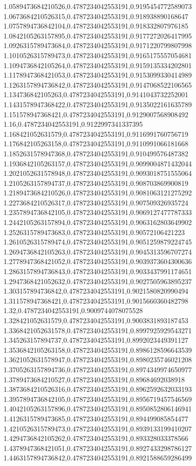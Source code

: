 1.0589473684210526,0.4787234042553191,0.9195454772589073
1.0673684210526315,0.4787234042553191,0.918938890168647
1.0757894736842104,0.4787234042553191,0.918332807976185
1.0842105263157895,0.4787234042553191,0.9177272026417995
1.0926315789473684,0.4787234042553191,0.9171220799807998
1.1010526315789473,0.4787234042553191,0.9165175557054681
1.1094736842105264,0.4787234042553191,0.9159135334202801
1.1178947368421053,0.4787234042553191,0.9153099330414989
1.1263157894736842,0.4787234042553191,0.9147068522106565
1.134736842105263,0.4787234042553191,0.9141043732252001
1.1431578947368422,0.4787234042553191,0.9135022161635789
1.151578947368421,0.4787234042553191,0.9129007568908492
1.16,0.4787234042553191,0.9122997341337395
1.168421052631579,0.4787234042553191,0.9116991760756719
1.176842105263158,0.4787234042553191,0.9110991066181668
1.1852631578947368,0.4787234042553191,0.910499576487382
1.1936842105263157,0.4787234042553191,0.9099004871432044
1.2021052631578948,0.4787234042553191,0.9093018751555064
1.2105263157894737,0.4787234042553191,0.908703869900819
1.2189473684210526,0.4787234042553191,0.9081063121275292
1.2273684210526317,0.4787234042553191,0.907509326935724
1.2357894736842105,0.4787234042553191,0.9069127477787333
1.2442105263157894,0.4787234042553191,0.9063162803649902
1.2526315789473683,0.4787234042553191,0.90572106421223
1.2610526315789474,0.4787234042553191,0.9051259879224745
1.2694736842105263,0.4787234042553191,0.9045313596707274
1.2778947368421052,0.4787234042553191,0.9039373604300636
1.2863157894736843,0.4787234042553191,0.9033437991174651
1.2947368421052632,0.4787234042553191,0.9027505963895237
1.303157894736842,0.4787234042553191,0.9021580820990494
1.311578947368421,0.4787234042553191,0.9015660360482798
1.32,0.4787234042553191,0.9009744078075528
1.328421052631579,0.4787234042553191,0.9003831893187453
1.3368421052631578,0.4787234042553191,0.8997925929543271
1.345263157894737,0.4787234042553191,0.8992023449391127
1.3536842105263158,0.4787234042553191,0.8986128596643539
1.3621052631578947,0.4787234042553191,0.8980235746021208
1.3705263157894736,0.4787234042553191,0.8974349974650977
1.3789473684210527,0.4787234042553191,0.89684692038918
1.3873684210526316,0.4787234042553191,0.8962592632033193
1.3957894736842105,0.4787234042553191,0.8956719457546569
1.4042105263157896,0.4787234042553191,0.8950852806146941
1.4126315789473685,0.4787234042553191,0.894499085854477
1.4210526315789473,0.4787234042553191,0.8939133199410207
1.4294736842105262,0.4787234042553191,0.893328033378566
1.4378947368421051,0.4787234042553191,0.8927433298786127
1.4463157894736842,0.4787234042553191,0.8921588659286499
